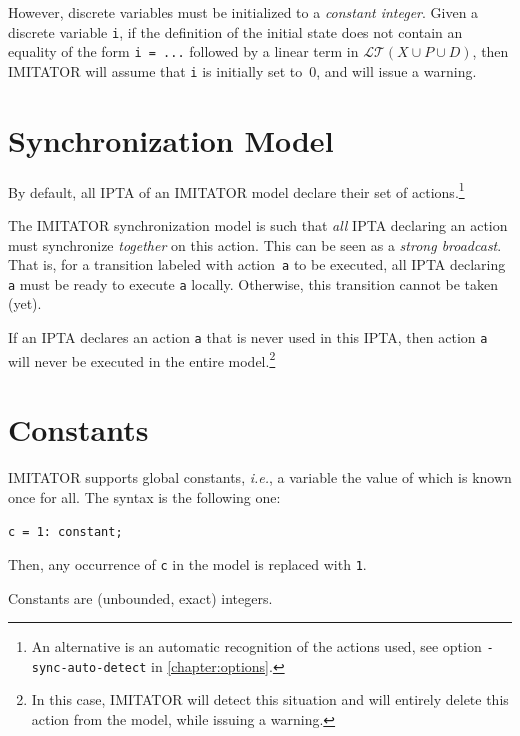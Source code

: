 \documentclass[a4paper,11pt]{report}
\newcommand{\Clock}{X} %
\newcommand{\DVar}{D} %
\newcommand{\LTerm}{\mathcal{LT}} %
\newcommand{\LTermXPD}{\LTerm(\Clock \cup \Param \cup \DVar)}
\newcommand{\Param}{P} %
\newcommand{\imitator}{\textsf{IMITATOR}}
\newcommand{\IPTA}{IPTA}
\newcommand{\styleIMI}[1]{\textcolor{imicolor}{\texttt{#1}}}
\newcommand{\styleOption}[1]{\textcolor{optioncolor}{\texttt{#1}}}
\newcommand{\ie}{\textcolor{colorok}{\textit{i.e.}, }}
\begin{document}
However, discrete variables must be initialized to a \emph{constant integer}.
Given a discrete variable \styleIMI{i}, if the definition of the initial state does not contain an equality of the form \styleIMI{i = ...} followed by a linear term in $\LTermXPD$, then \imitator{} will assume that \styleIMI{i} is initially set to~0, and will issue a warning.



\section{Synchronization Model}\label{sect:synchronization}

By default, all \IPTA{} of an \imitator{} model declare their set of actions.\footnote{%
	An alternative is an automatic recognition of the actions used, see option \styleOption{-sync-auto-detect} in \cref{chapter:options}.
}

The \imitator{} synchronization model is such that \emph{all} \IPTA{} declaring an action must synchronize \emph{together} on this action.
This can be seen as a \emph{strong broadcast}.
That is, for a transition labeled with action~\styleIMI{a} to be executed, all \IPTA{} declaring \styleIMI{a} must be ready to execute \styleIMI{a} locally.
Otherwise, this transition cannot be taken (yet).

If an \IPTA{} declares an action \styleIMI{a} that is never used in this \IPTA{}, then action \styleIMI{a} will never be executed in the entire model.\footnote{%
	In this case, \imitator{} will detect this situation and will entirely delete this action from the model, while issuing a warning.
}

\section{Constants}

\imitator{} supports global constants, \ie{} a variable the value of which is known once for all.
The syntax is the following one:
	\begin{center}
		\styleIMI{c = 1: constant;}
	\end{center}
Then, any occurrence of \styleIMI{c} in the model is replaced with \styleIMI{1}.

Constants are (unbounded, exact) integers.
\end{document}
